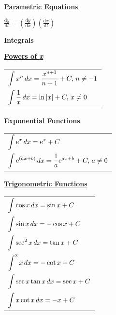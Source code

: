 \documentclass[11pt,a4paper]{book}
\let\csc\relax
\DeclareMathOperator{\csc}{cosec}
\begin{document}
\begin{sidewaysfigure}
\begin{minipage}[t]{0.3\textwidth}
\vspace{.5cm}

\textbf{\large{}\uline{Parametric Equations}}{\large\par}

\vspace{.5cm}

\hspace{.5cm}${\displaystyle \frac{\mathrm{d}y}{\mathrm{d}t}=\left(\frac{\mathrm{d}y}{\mathrm{d}x}\right)\left(\frac{\mathrm{d}x}{\mathrm{d}t}\right)}$


\end{minipage}
\begin{minipage}[t]{0.23\textwidth}
\begin{center}
\textbf{\Large{}Integrals}{\Large\par}
\par\end{center}

\textbf{\large{}\uline{Powers of }}\textbf{\textit{\large{}\uline{x}}}{\large\par}
\setlength{\extrarowheight}{0.35cm}
\begin{tabular}{>{\raggedright}p{6cm}}
${\displaystyle \int x^{n}\thinspace dx=\frac{x^{n+1}}{n+1}+C,\, n\ne-1}$\tabularnewline
${\displaystyle \int\frac{1}{x}\thinspace dx=\ln\left|x\right|+C,\, x\ne0}$\tabularnewline
\end{tabular}

\vspace{0.5cm}

\textbf{\large{}\uline{Exponential Functions}}{\large\par}

\begin{tabular}{>{\raggedright}p{6cm}}
${\displaystyle \int \mathrm{e}^{x}\thinspace dx=\mathrm{e}^{x}+C}$\tabularnewline
${\displaystyle \int \mathrm{e}^{(ax+b)}\thinspace dx=\frac{1}{a}\mathrm{e}^{ax+b}+C,\, a\ne0}$\tabularnewline
\end{tabular}

\vspace{0.5cm}

\textbf{\large{}\uline{Trigonometric Functions}}{\large\par}

\begin{tabular}{>{\raggedright}p{6cm}}
${\displaystyle \int\cos x\thinspace dx=\sin x+C}$\tabularnewline
${\displaystyle \int\sin x\thinspace dx=-\cos x+C}$\tabularnewline
${\displaystyle \int\sec^{2}x\thinspace dx=\tan x+C}$\tabularnewline
${\displaystyle \int\csc^{2}x\thinspace dx=-\cot x+C}$\tabularnewline
${\displaystyle \int\sec x\tan x\thinspace dx=\sec x+C}$\tabularnewline
${\displaystyle \int\csc x\cot x\thinspace dx=-\csc x+C}$\tabularnewline
\end{tabular}


\end{minipage}
\end{sidewaysfigure}
\end{document}
